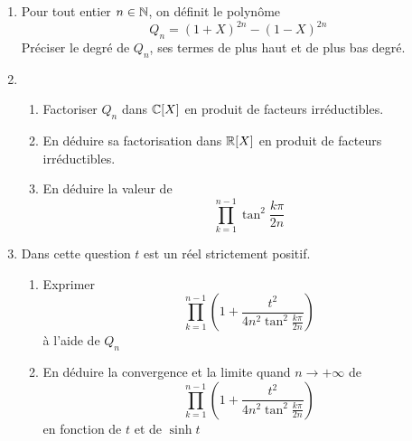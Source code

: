 \begin{enumerate}
\item Pour tout entier $n \in \mathbb{N}$, on définit le polynôme
\[Q_{n}=(1+X)^{2n}-(1-X)^{2n}\]
Préciser le degré de $Q_{n}$, ses termes de plus haut et de plus bas degré.
\item \begin{enumerate} \item Factoriser $Q_{n}$ dans $\mathbb{C}[X]$ en produit de facteurs irréductibles.
\item En déduire sa factorisation dans $\mathbb{R}[X]$ en produit de facteurs irréductibles.
\item En déduire la valeur de 
\[\prod_{k=1}^{n-1}\tan ^{2}\frac{k\pi }{2n}\]
\end{enumerate}

\item Dans cette question $t$ est un réel strictement positif.
\begin{enumerate}
\item Exprimer 
\[
\prod_{k=1}^{n-1}\left( 1+\frac{t^{2}}{4n^{2}\tan ^{2}\frac{k\pi }{2n}}\right)
\]
à l'aide de $Q_{n}$
\item En déduire la convergence et la limite quand $n\rightarrow +\infty$ de
\[
\prod_{k=1}^{n-1}\left( 1+\frac{t^{2}}{4n^{2}\tan ^{2}\frac{k\pi }{2n}}\right)
\]
en fonction de $t$ et de $\sinh t$
\end{enumerate}
\end{enumerate}
